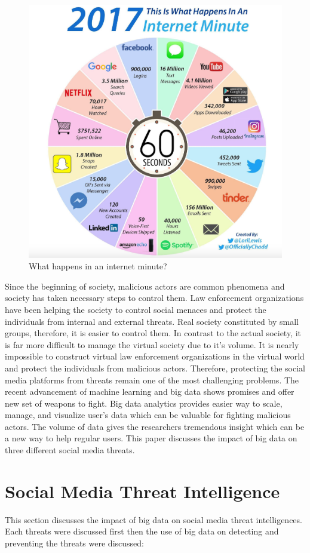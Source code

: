 \documentclass[sigconf]{acmart}
\begin{document}
\begin{figure}[!ht]
 \centering\includegraphics[width=0.5\columnwidth]{images/one-internet-minute.png}
  \caption{What happens in an internet minute?~\cite{social-media2}}\label{f:socialmedia}
\end{figure}

Since the beginning of society, malicious actors are common phenomena and society has taken necessary steps to control them. Law enforcement organizations have been helping the society to control social menaces and protect the individuals from internal and external threats.  Real society constituted by small groups, therefore, it is easier to control  them. In contrast to the actual society, it is far more difficult to manage the virtual society due to it's volume. It is nearly impossible to construct virtual law enforcement organizations in the virtual world and protect the individuals from malicious actors. Therefore, protecting the social media platforms from threats remain one of the most challenging problems. The recent advancement of machine learning and big data shows promises and offer new set of weapons to fight. Big data analytics provides easier way to scale, manage, and visualize user's data which can be valuable for fighting malicious actors. The volume of data gives the researchers tremendous insight which can be a new way to help regular users. This paper discusses the impact of big data on three different social media threats.

\section{Social Media Threat Intelligence}
This section discusses the impact of big data on social media threat intelligences. Each threats were discussed first then the use of big data on detecting and preventing the threats were discussed:
\end{document}
